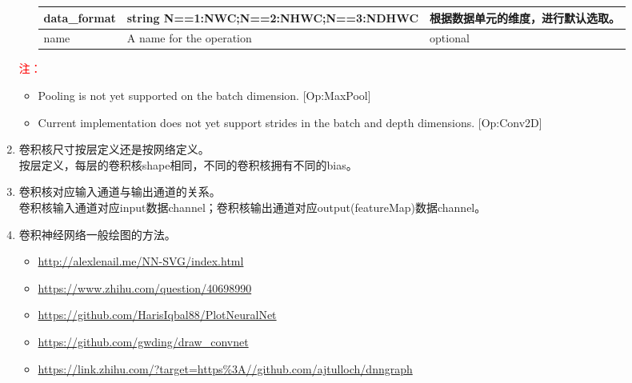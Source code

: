 \begin{enumerate}
\begin{enumerate}
\begin{table}[!h]
{\begin{tabular}{|l|l|l|}
data\_format & string N==1:NWC;N==2:NHWC;N==3:NDHWC                                                                                               & 根据数据单元的维度，进行默认选取。                                                                   \\ \hline
name         & A name for the operation                                                                                                           & optional                                                                            \\ \hline
\end{tabular}}
\end{table}
  \end{enumerate}
  \noindent\textcolor{red}{注：}
\begin{itemize}
  \item  Pooling is not yet supported on the batch dimension. [Op:MaxPool]
  \item  Current implementation does not yet support strides in the batch and depth dimensions. [Op:Conv2D]
\end{itemize}
  \item 卷积核尺寸按层定义还是按网络定义。\\
  按层定义，每层的卷积核shape相同，不同的卷积核拥有不同的bias。
  \item 卷积核对应输入通道与输出通道的关系。\\
  卷积核输入通道对应input数据channel；卷积核输出通道对应output(featureMap)数据channel。
  \item 卷积神经网络一般绘图的方法。\\
  \begin{itemize}
    \item \url{http://alexlenail.me/NN-SVG/index.html}
    \item \url{https://www.zhihu.com/question/40698990}
    \item \url{https://github.com/HarisIqbal88/PlotNeuralNet}
    \item \url{https://github.com/gwding/draw_convnet}
    \item \url{https://link.zhihu.com/?target=https\%3A//github.com/ajtulloch/dnngraph}
  \end{itemize}
\end{enumerate}



